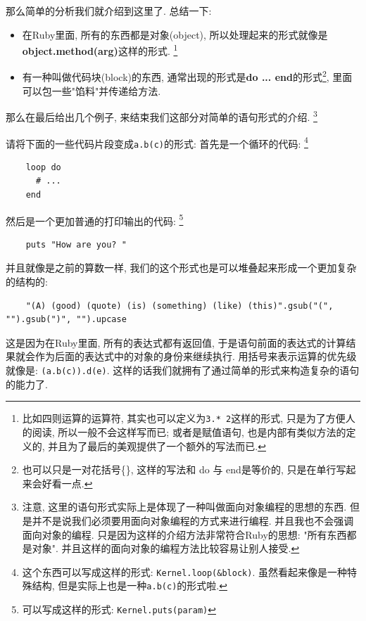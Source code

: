 那么简单的分析我们就介绍到这里了. 总结一下: 

\begin{itemize}
  \item 在Ruby里面, 所有的东西都是对象(object), 所以处理起来的形式就像是\textbf{object.method(arg)}这样的形式. \footnote{比如四则运算的运算符, 其实也可以定义为\texttt{3.* 2}这样的形式, 只是为了方便人的阅读, 所以一般不会这样写而已; 或者是赋值语句, 也是内部有类似方法的定义的, 并且为了最后的美观提供了一个额外的写法而已. }
  \item 有一种叫做代码块(block)的东西, 通常出现的形式是\textbf{do ... end}的形式\footnote{也可以只是一对花括号\{\}, 这样的写法和 do 与 end是等价的, 只是在单行写起来会好看一点. }, 里面可以包一些"馅料"并传递给方法. 
\end{itemize}

那么在最后给出几个例子, 来结束我们这部分对简单的语句形式的介绍. \footnote{注意, 这里的语句形式实际上是体现了一种叫做面向对象编程的思想的东西. 但是并不是说我们必须要用面向对象编程的方式来进行编程. 并且我也不会强调面向对象的编程. 只是因为这样的介绍方法非常符合Ruby的思想: "所有东西都是对象". 并且这样的面向对象的编程方法比较容易让别人接受. }

\begin{example}
  请将下面的一些代码片段变成\texttt{a.b(c)}的形式: 
  首先是一个循环的代码: \footnote{这个东西可以写成这样的形式: \texttt{Kernel.loop(&block)}. 虽然看起来像是一种特殊结构, 但是实际上也是一种\texttt{a.b(c)}的形式啦. }
  \begin{verbatim}
    loop do
      # ...
    end
  \end{verbatim}
  
  然后是一个更加普通的打印输出的代码: \footnote{可以写成这样的形式: \texttt{Kernel.puts(param)}}
  \begin{verbatim}
    puts "How are you? "
  \end{verbatim}

  并且就像是之前的算数一样, 我们的这个形式也是可以堆叠起来形成一个更加复杂的结构的: 
  \begin{verbatim}
    "(A) (good) (quote) (is) (something) (like) (this)".gsub("(", "").gsub(")", "").upcase
  \end{verbatim}

  这是因为在Ruby里面, 所有的表达式都有返回值, 于是语句前面的表达式的计算结果就会作为后面的表达式中的对象的身份来继续执行. 用括号来表示运算的优先级就像是: \texttt{(a.b(c)).d(e)}. 这样的话我们就拥有了通过简单的形式来构造复杂的语句的能力了. 
\end{example}

